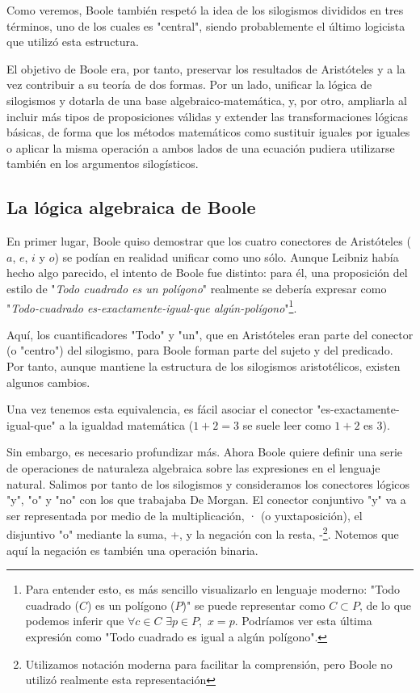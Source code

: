 \documentclass{article}
\begin{document}
Como veremos, Boole también respetó la idea de los silogismos divididos en tres términos, uno de los cuales es "central", siendo probablemente el último logicista que utilizó esta estructura.

El objetivo de Boole era, por tanto, preservar los resultados de Aristóteles y a la vez contribuir a su teoría de dos formas. Por un lado, unificar la lógica de silogismos y dotarla de una base algebraico-matemática, y, por otro, ampliarla al incluir más tipos de proposiciones válidas y extender las transformaciones lógicas básicas, de forma que los métodos matemáticos como sustituir iguales por iguales o aplicar la misma operación a ambos lados de una ecuación pudiera utilizarse también en los argumentos silogísticos\cite{boole2003laws}.

\subsection{La lógica algebraica de Boole}

En primer lugar, Boole quiso demostrar que los cuatro conectores de Aristóteles ($a$, $e$, $i$ y $o$) se podían en realidad unificar como uno sólo. Aunque Leibniz había hecho algo parecido, el intento de Boole fue distinto: para él, una proposición del estilo de "\textit{Todo cuadrado es un polígono}" realmente se debería expresar como "\textit{Todo-cuadrado es-exactamente-igual-que algún-polígono}"\footnote{Para entender esto, es más sencillo visualizarlo en lenguaje moderno: "Todo cuadrado ($C$) es un polígono ($P$)" se puede representar como $C \subset P$, de lo que podemos inferir que $\forall c \in C \,\, \exists p \in P, \,\, x = p$. Podríamos ver esta última expresión como "Todo cuadrado es igual a algún polígono".}.

Aquí, los cuantificadores "Todo" y "un", que en Aristóteles eran parte del conector (o "centro") del silogismo, para Boole forman parte del sujeto y del predicado. Por tanto, aunque mantiene la estructura de los silogismos aristotélicos, existen algunos cambios.

Una vez tenemos esta equivalencia, es fácil asociar el conector "es-exactamente-igual-que" a la igualdad matemática ($1+2=3$ se suele leer como $1+2$ es $3$).

Sin embargo, es necesario profundizar más. Ahora Boole quiere definir una serie de operaciones de naturaleza algebraica sobre las expresiones en el lenguaje natural. Salimos por tanto de los silogismos y consideramos los conectores lógicos "y", "o" y "no" con los que trabajaba De Morgan. El conector conjuntivo "y" va a ser representada por medio de la multiplicación, · (o yuxtaposición), el disjuntivo "o" mediante la suma, +, y la negación con la resta, -\footnote{Utilizamos notación moderna para facilitar la comprensión, pero Boole no utilizó realmente esta representación}. Notemos que aquí la negación es también una operación binaria.
\end{document}
